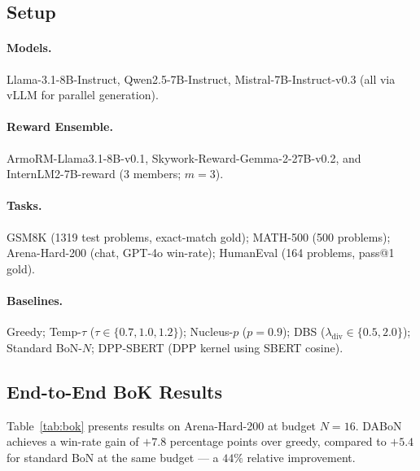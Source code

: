 \documentclass{article}
\begin{document}
\subsection{Setup}
\label{sec:exp_setup}

\paragraph{Models.}  Llama-3.1-8B-Instruct, Qwen2.5-7B-Instruct,
Mistral-7B-Instruct-v0.3 (all via vLLM for parallel generation).

\paragraph{Reward Ensemble.}  ArmoRM-Llama3.1-8B-v0.1,
Skywork-Reward-Gemma-2-27B-v0.2, and InternLM2-7B-reward (3 members;
$m=3$).

\paragraph{Tasks.}  GSM8K (1319 test problems, exact-match gold);
MATH-500 (500 problems); Arena-Hard-200 (chat, GPT-4o win-rate);
HumanEval (164 problems, pass@1 gold).

\paragraph{Baselines.}  Greedy; Temp-$\tau$ ($\tau \in \{0.7, 1.0, 1.2\}$);
Nucleus-$p$ ($p=0.9$); DBS ($\lambda_{\mathrm{div}} \in \{0.5, 2.0\}$);
Standard BoN-$N$; DPP-SBERT (DPP kernel using SBERT cosine).

\subsection{End-to-End BoK Results}
\label{sec:bokresults}

Table~\ref{tab:bok} presents results on Arena-Hard-200 at budget $N=16$.
DABoN achieves a win-rate gain of $+7.8$ percentage points over greedy,
compared to $+5.4$ for standard BoN at the same budget --- a $44\%$
relative improvement.
\end{document}
